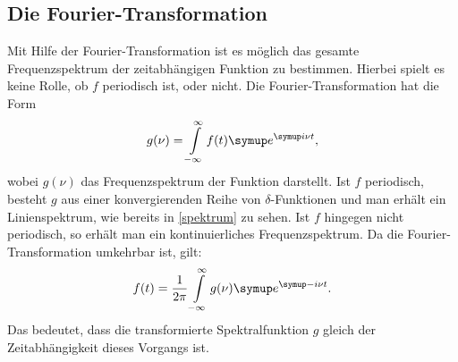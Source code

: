 \subsection{Die Fourier-Transformation}
Mit Hilfe der Fourier-Transformation ist es möglich das gesamte Frequenzspektrum
der zeitabhängigen Funktion zu bestimmen. Hierbei spielt es keine Rolle, ob
$f$ periodisch ist, oder nicht. Die Fourier-Transformation hat die Form
\begin{equation}
  g(\nu) = \int\limits_{-\infty}^{\infty}f(t)\su{e}^{\su{i}\nu t},
\end{equation}
wobei $g(\nu)$ das Frequenzspektrum der Funktion darstellt. Ist $f$ periodisch,
besteht $g$ aus einer konvergierenden Reihe von $\delta$-Funktionen und man
erhält ein Linienspektrum, wie bereits in \ref{spektrum} zu sehen. Ist $f$
hingegen nicht periodisch, so erhält man ein kontinuierliches Frequenzspektrum.
Da die Fourier-Transformation umkehrbar ist, gilt:
\begin{equation}
  f(t) = \frac{1}{2\pi}\int\limits_{-\infty}^\infty g(\nu)\su{e}^{\su{-i}\nu t}.
\end{equation}
Das bedeutet, dass die transformierte Spektralfunktion $g$ gleich der
Zeitabhängigkeit dieses Vorgangs ist.
